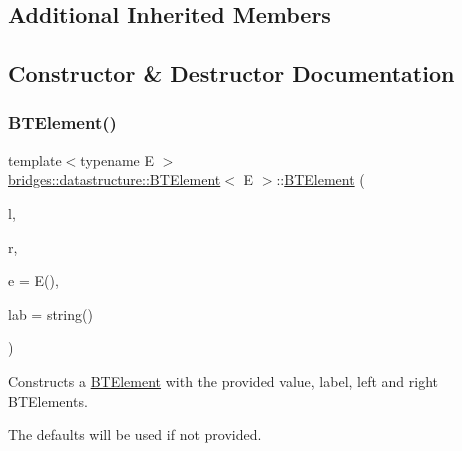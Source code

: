 \subsection*{Additional Inherited Members}


\subsection{Constructor \& Destructor Documentation}
\mbox{\label{classbridges_1_1datastructure_1_1_b_t_element_a7d93a35b1f2553cfd92a289a363caa5a}} 
\subsubsection{\texorpdfstring{B\+T\+Element()}{BTElement()}\hspace{0.1cm}{\footnotesize\ttfamily [1/2]}}
{\footnotesize\ttfamily template$<$typename E $>$ \\
\hyperlink{classbridges_1_1datastructure_1_1_b_t_element}{bridges\+::datastructure\+::\+B\+T\+Element}$<$ E $>$\+::\hyperlink{classbridges_1_1datastructure_1_1_b_t_element}{B\+T\+Element} (\begin{DoxyParamCaption}\item[{\hyperlink{classbridges_1_1datastructure_1_1_b_t_element}{B\+T\+Element}$<$ E $>$ $\ast$}]{l,  }\item[{\hyperlink{classbridges_1_1datastructure_1_1_b_t_element}{B\+T\+Element}$<$ E $>$ $\ast$}]{r,  }\item[{const E \&}]{e = {\ttfamily E()},  }\item[{const string \&}]{lab = {\ttfamily string()} }\end{DoxyParamCaption})\hspace{0.3cm}{\ttfamily [inline]}}



Constructs a \hyperlink{classbridges_1_1datastructure_1_1_b_t_element}{B\+T\+Element} with the provided value, label, left and right B\+T\+Elements. 

The defaults will be used if not provided.


